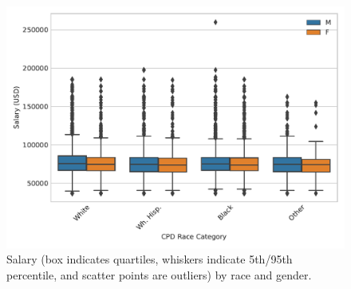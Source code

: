 \begin{figure}[t!] 
	\includegraphics[width=\textwidth]{figs/salary_by_race_gender} 
	\caption{Salary (box indicates quartiles, whiskers indicate 5th/95th percentile, and scatter points are outliers) by race and gender.} \label{fig:salary_gender_race}
\end{figure}






